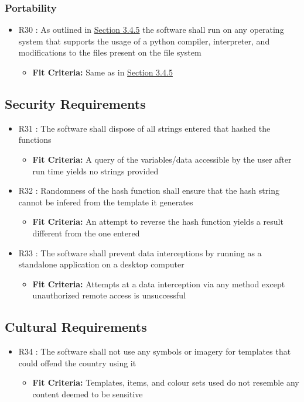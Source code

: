 \documentclass[12pt, titlepage]{article}
\begin{document}
\subsubsection{Portability}
\begin{itemize}
\item{R30 : As outlined in \hyperref[sec:ETE]{Section 3.4.5} the software shall run on any operating system that supports the usage of a python compiler, interpreter, and modifications to the files present on the file system}
\begin{itemize}
\item{\textbf{Fit Criteria:} Same as in \hyperref[sec:ETE]{Section 3.4.5}}
\end{itemize}
\end{itemize}
\subsection{Security Requirements}
\begin{itemize}
\item{R31 : The software shall dispose of all strings entered that hashed the functions}
\begin{itemize}
\item{\textbf{Fit Criteria:} A query of the variables/data accessible by the user after run time yields no strings provided}
\end{itemize}
\item{R32 : Randomness of the hash function shall ensure that the hash string cannot be infered from the template it generates}
\begin{itemize}
\item{\textbf{Fit Criteria:} An attempt to reverse the hash function yields a result different from the one entered}
\end{itemize}
\item{R33 : The software shall prevent data interceptions by running as a standalone application on a desktop computer}
\begin{itemize}
\item{\textbf{Fit Criteria:} Attempts at a data interception via any method except unauthorized remote access is unsuccessful}
\end{itemize}
\end{itemize}
\subsection{Cultural Requirements}
\begin{itemize}
\item{R34 : The software shall not use any symbols or imagery for templates that could offend the country using it}
\begin{itemize}
\item{\textbf{Fit Criteria:} Templates, items, and colour sets used do not resemble any content deemed to be sensitive}
\end{itemize}
\end{itemize}
\end{document}
